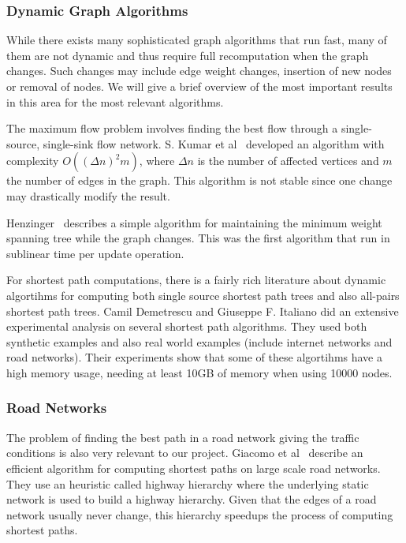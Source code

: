\subsubsection{Dynamic Graph Algorithms}

While there exists many sophisticated graph algorithms that run fast, many of them are not dynamic and thus require full recomputation when the graph changes. Such changes may include edge weight changes, insertion of new nodes or removal of nodes. We will give a brief overview of the most important results in this area for the most relevant algorithms.

The maximum flow problem involves finding the best flow through a single-source, single-sink flow network.
S. Kumar et al~\cite{maxflow} developed an algorithm with complexity $O((\Delta n)^{2}m)$, where $\Delta n$ is the number of affected vertices and $m$ the number of edges in the graph. This algorithm is not stable since one change may drastically modify the result.

Henzinger~\cite{Henzinger97maintainingminimum} describes a simple algorithm for maintaining the minimum weight spanning tree while the graph changes. This was the first algorithm that run in sublinear time per update operation.

For shortest path computations, there is a fairly rich literature about dynamic algortihms for computing both single source shortest path trees and also all-pairs shortest path trees. Camil Demetrescu and Giuseppe F. Italiano did an extensive experimental analysis \cite{Demetrescu04experimentalanalysis} on several shortest path algorithms. They used both synthetic examples and also real world examples (include internet networks and road networks). Their experiments show that some of these algortihms have a high memory usage, needing at least 10GB of memory when using 10000 nodes.

\subsubsection{Road Networks}

The problem of finding the best path in a road network giving the traffic conditions is also very relevant to our project.
Giacomo et al~\cite{DBLP:journals/corr/abs-0704-1068} describe an efficient algorithm for computing shortest paths on large scale road networks. They use an heuristic called highway hierarchy where the underlying static network is used to build a highway hierarchy. Given that the edges of a road network usually never change, this hierarchy speedups the process of computing shortest paths.

